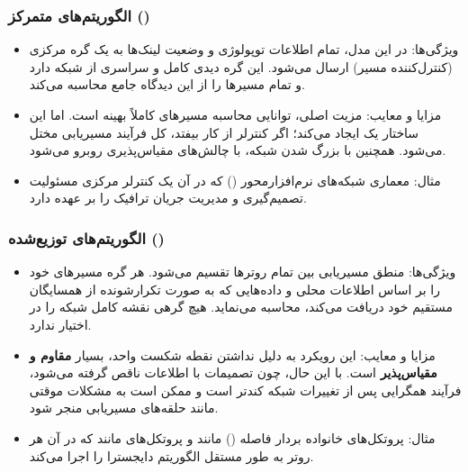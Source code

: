 \subsubsection*{الگوریتم‌های متمرکز ()}
\begin{itemize}
	\item {ویژگی‌ها:} در این مدل، تمام اطلاعات توپولوژی و وضعیت لینک‌ها به یک گره مرکزی (کنترل‌کننده مسیر) ارسال می‌شود. این گره دیدی کامل و سراسری از شبکه دارد و تمام مسیرها را از این دیدگاه جامع محاسبه می‌کند.
	
	\item {مزایا و معایب:} مزیت اصلی، توانایی محاسبه {مسیرهای کاملاً بهینه} است. اما این ساختار یک   ایجاد می‌کند؛ اگر کنترلر از کار بیفتد، کل فرآیند مسیریابی مختل می‌شود. همچنین با بزرگ شدن شبکه، با {چالش‌های مقیاس‌پذیری} روبرو می‌شود.
	
	\item {مثال:} معماری {شبکه‌های نرم‌افزارمحور ()} که در آن یک کنترلر مرکزی مسئولیت تصمیم‌گیری و مدیریت جریان ترافیک را بر عهده دارد.
\end{itemize}

\subsubsection*{الگوریتم‌های توزیع‌شده ()}
\begin{itemize}
	\item {ویژگی‌ها:} منطق مسیریابی بین تمام روترها تقسیم می‌شود. هر گره مسیرهای خود را بر اساس {اطلاعات محلی} و داده‌هایی که به صورت {تکرارشونده از همسایگان مستقیم} خود دریافت می‌کند، محاسبه می‌نماید. هیچ گرهی نقشه کامل شبکه را در اختیار ندارد.
	
	\item {مزایا و معایب:} این رویکرد به دلیل نداشتن نقطه شکست واحد، بسیار \textbf{مقاوم و مقیاس‌پذیر} است. با این حال، چون تصمیمات با اطلاعات ناقص گرفته می‌شود، فرآیند {همگرایی} پس از تغییرات شبکه کندتر است و ممکن است به مشکلات موقتی مانند {حلقه‌های مسیریابی} منجر شود.
	
	\item {مثال:} پروتکل‌های خانواده {بردار فاصله ()} مانند {} و پروتکل‌های  مانند {} که در آن هر روتر به طور مستقل الگوریتم دایجسترا را اجرا می‌کند.
\end{itemize}
